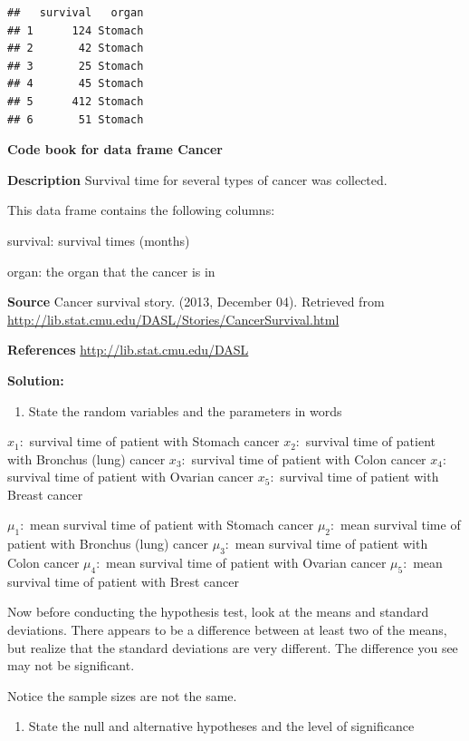 \documentclass[]{book}
\providecommand{\tightlist}{%
  \setlength{\itemsep}{0pt}\setlength{\parskip}{0pt}}
\begin{document}
\begin{verbatim}
##   survival   organ
## 1      124 Stomach
## 2       42 Stomach
## 3       25 Stomach
## 4       45 Stomach
## 5      412 Stomach
## 6       51 Stomach
\end{verbatim}

\textbf{Code book for data frame Cancer}

\textbf{Description}
Survival time for several types of cancer was collected.

This data frame contains the following columns:

survival: survival times (months)

organ: the organ that the cancer is in

\textbf{Source}
Cancer survival story. (2013, December 04). Retrieved from
\url{http://lib.stat.cmu.edu/DASL/Stories/CancerSurvival.html}

\textbf{References}
\url{http://lib.stat.cmu.edu/DASL}

\textbf{Solution:}

\begin{enumerate}
\def\labelenumi{\arabic{enumi}.}
\tightlist
\item
  State the random variables and the parameters in words
\end{enumerate}

\(x_1:\) survival time of patient with Stomach cancer
\(x_2:\) survival time of patient with Bronchus (lung) cancer
\(x_3:\) survival time of patient with Colon cancer
\(x_4:\) survival time of patient with Ovarian cancer
\(x_5:\) survival time of patient with Breast cancer

\(\mu_1:\) mean survival time of patient with Stomach cancer
\(\mu_2:\) mean survival time of patient with Bronchus (lung) cancer
\(\mu_3:\) mean survival time of patient with Colon cancer
\(\mu_4:\) mean survival time of patient with Ovarian cancer
\(\mu_5:\) mean survival time of patient with Brest cancer

Now before conducting the hypothesis test, look at the means and standard deviations. There appears to be a difference between at least two of the means, but realize that the standard deviations are very different. The difference you see may not be significant.

Notice the sample sizes are not the same.

\begin{enumerate}
\def\labelenumi{\arabic{enumi}.}
\setcounter{enumi}{1}
\tightlist
\item
  State the null and alternative hypotheses and the level of significance
\end{enumerate}
\end{document}
